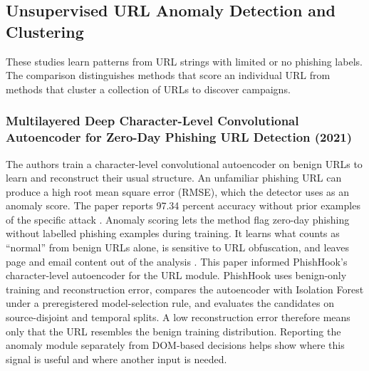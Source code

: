 \documentclass{FastFyp}
\begin{document}
\subsection{Unsupervised URL Anomaly Detection and Clustering}
These studies learn patterns from URL strings with limited or no phishing labels. The comparison distinguishes methods that score an individual URL from methods that cluster a collection of URLs to discover campaigns.

\subsubsection{Multilayered Deep Character-Level Convolutional Autoencoder for Zero-Day Phishing URL Detection (2021)}
The authors train a character-level convolutional autoencoder on benign URLs to learn and reconstruct their usual structure. An unfamiliar phishing URL can produce a high root mean square error (RMSE), which the detector uses as an anomaly score. The paper reports 97.34 percent accuracy without prior examples of the specific attack \cite{charcnn2021}. Anomaly scoring lets the method flag zero-day phishing without labelled phishing examples during training. It learns what counts as ``normal'' from benign URLs alone, is sensitive to URL obfuscation, and leaves page and email content out of the analysis \cite{charcnn2021}. This paper informed PhishHook's character-level autoencoder for the URL module. PhishHook uses benign-only training and reconstruction error, compares the autoencoder with Isolation Forest under a preregistered model-selection rule, and evaluates the candidates on source-disjoint and temporal splits. A low reconstruction error therefore means only that the URL resembles the benign training distribution. Reporting the anomaly module separately from DOM-based decisions helps show where this signal is useful and where another input is needed.
\end{document}
